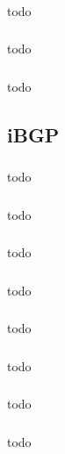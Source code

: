 \documentclass[a4paper, 12pt]{article}
\begin{document}
		\subsubsection{}
			todo

		\subsubsection{}
			todo

		\subsubsection{}
			todo

	\subsection{iBGP}

		\subsubsection{}
			todo

		\subsubsection{}
			todo

		\subsubsection{}
			todo

		\subsubsection{}
			todo

		\subsubsection{}
			todo

		\subsubsection{}
			todo

		\subsubsection{}
			todo

		\subsubsection{}
			todo
\end{document}
